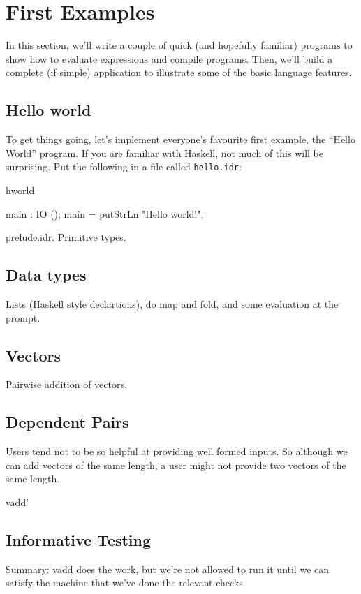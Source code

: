 \section{First Examples}

In this section, we'll write a couple of quick (and hopefully
familiar) programs to show how to evaluate expressions and compile
programs. Then, we'll build a complete (if simple) application to
illustrate some of the basic language features.

\subsection{Hello world}

To get things going, let's implement everyone's favourite first
example, the ``Hello World'' program. If you are familiar with
Haskell, not much of this will be surprising. Put the following in a
file called \texttt{hello.idr}:

\begin{SaveVerbatim}{hworld}

main : IO ();
main = putStrLn "Hello world!";

\end{SaveVerbatim}


prelude.idr. Primitive types.

\subsection{Data types}

Lists (Haskell style declartions), do map and fold, and some evaluation at the \Idris{} prompt.

\subsection{Vectors}

Pairwise addition of vectors.

\subsection{Dependent Pairs}

Users tend not to be so helpful at providing well formed inputs. So
although we can add vectors of the same length, a user might not
provide two vectors of the same length.

vadd'

\subsection{Informative Testing}


Summary: vadd does the work, but we're not allowed to run it until we
can satisfy the machine that we've done the relevant checks.
